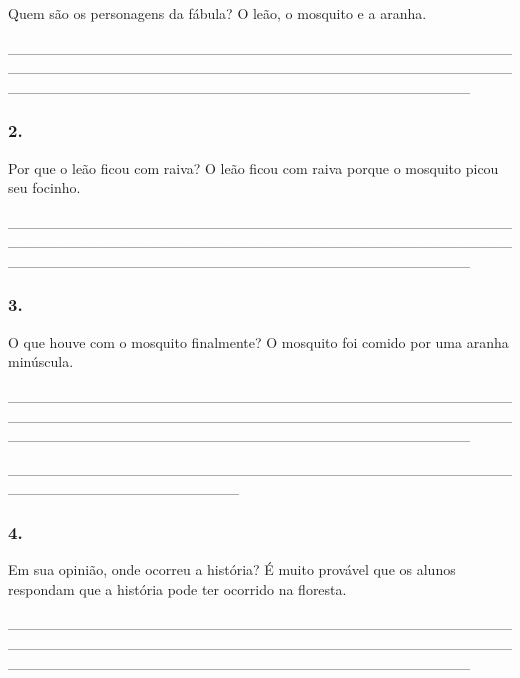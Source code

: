 Quem são os personagens da fábula? O leão, o mosquito e a aranha.

\_\_\_\_\_\_\_\_\_\_\_\_\_\_\_\_\_\_\_\_\_\_\_\_\_\_\_\_\_\_\_\_\_\_\_\_\_\_\_\_\_\_\_\_\_\_\_\_\_\_\_\_\_\_\_\_\_\_\_\_\_\_\_\_\_\_\_\_\_\_\_\_\_\_\_\_\_\_\_\_\_\_\_\_\_\_\_\_\_\_\_\_\_\_\_\_\_\_\_\_\_\_\_\_\_\_\_\_\_\_\_\_\_\_\_\_\_\_\_\_\_\_\_\_\_\_\_\_\_\_\_\_\_\_\_\_\_\_\_\_

\subsubsection{2. }\label{section-1}

Por que o leão ficou com raiva? O leão ficou com raiva porque o mosquito
picou seu focinho.

\_\_\_\_\_\_\_\_\_\_\_\_\_\_\_\_\_\_\_\_\_\_\_\_\_\_\_\_\_\_\_\_\_\_\_\_\_\_\_\_\_\_\_\_\_\_\_\_\_\_\_\_\_\_\_\_\_\_\_\_\_\_\_\_\_\_\_\_\_\_\_\_\_\_\_\_\_\_\_\_\_\_\_\_\_\_\_\_\_\_\_\_\_\_\_\_\_\_\_\_\_\_\_\_\_\_\_\_\_\_\_\_\_\_\_\_\_\_\_\_\_\_\_\_\_\_\_\_\_\_\_\_\_\_\_\_\_\_\_\_

\subsubsection{3. }\label{section-2}

O que houve com o mosquito finalmente? O mosquito foi comido por uma
aranha minúscula.

\_\_\_\_\_\_\_\_\_\_\_\_\_\_\_\_\_\_\_\_\_\_\_\_\_\_\_\_\_\_\_\_\_\_\_\_\_\_\_\_\_\_\_\_\_\_\_\_\_\_\_\_\_\_\_\_\_\_\_\_\_\_\_\_\_\_\_\_\_\_\_\_\_\_\_\_\_\_\_\_\_\_\_\_\_\_\_\_\_\_\_\_\_\_\_\_\_\_\_\_\_\_\_\_\_\_\_\_\_\_\_\_\_\_\_\_\_\_\_\_\_\_\_\_\_\_\_\_\_\_\_\_\_\_\_\_\_\_\_\_

\_\_\_\_\_\_\_\_\_\_\_\_\_\_\_\_\_\_\_\_\_\_\_\_\_\_\_\_\_\_\_\_\_\_\_\_\_\_\_\_\_\_\_\_\_\_\_\_\_\_\_\_\_\_\_\_\_\_\_\_\_\_\_\_\_\_\_\_\_\_

\subsubsection{4. }\label{section-3}

Em sua opinião, onde ocorreu a história? É muito provável que os alunos
respondam que a história pode ter ocorrido na floresta.

\_\_\_\_\_\_\_\_\_\_\_\_\_\_\_\_\_\_\_\_\_\_\_\_\_\_\_\_\_\_\_\_\_\_\_\_\_\_\_\_\_\_\_\_\_\_\_\_\_\_\_\_\_\_\_\_\_\_\_\_\_\_\_\_\_\_\_\_\_\_\_\_\_\_\_\_\_\_\_\_\_\_\_\_\_\_\_\_\_\_\_\_\_\_\_\_\_\_\_\_\_\_\_\_\_\_\_\_\_\_\_\_\_\_\_\_\_\_\_\_\_\_\_\_\_\_\_\_\_\_\_\_\_\_\_\_\_\_\_\_

